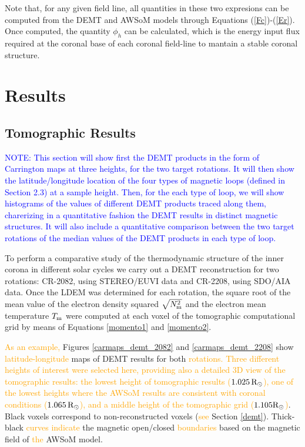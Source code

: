 \documentclass[namedreferences]{solarphysics}
\newcommand{\mrsun}{{\rm R_\odot}}
\newcommand{\Tm}{T_{\rm m}}
\newcommand{\Nsqm}{N^2_{{\rm m}}}
\newcommand{\sqravgN}{\sqrt{\Nsqm}}
\def\albert#1{\textcolor{orange}{#1}}
\def\notebyalbert#1{\textcolor{blue}{NOTE: #1}}
\begin{document}
\begin{article}
{Note that, for any given field line, all quantities in these two expresions can be computed from the DEMT and AWSoM models through Equations (\ref{Fc})-(\ref{Er}). Once computed, the quantity $\phi_h$ can be calculated, which is the energy input flux required at the coronal base of each coronal field-line to mantain a stable coronal structure.}


\section{Results}\label{resu} 

\subsection{Tomographic Results}\label{demt_res} 

\noindent\notebyalbert{This section will show first the DEMT products in the form of Carrington maps at three heights, for the two target rotations. It will then show the latitude/longitude location of the four types of  magnetic loops (defined in Section 2.3) at a sample height. Then, for the each type of loop, we will show histograms of the values of different DEMT products traced along them, charerizing in a quantitative fashion the DEMT results in distinct magnetic structures. It will also include a quantitative comparison between the two target rotations of the median values of the DEMT products in each type of loop.}

{To perform a comparative study of the thermodynamic structure of the inner corona in different solar cycles
we carry out a DEMT reconstruction for two rotations: CR-2082, using STEREO/EUVI data and CR-2208, using SDO/AIA data.} {Once the LDEM was determined for each rotation, the square root of the mean value of the electron density squared $\sqravgN$ and the electron mean temperature $\Tm$ were computed at each voxel of the tomographic computational grid by means of Equations \ref{momento1} and \ref{momento2}.} 

\albert{As an example,} Figures \ref{carmaps_demt_2082} and \ref{carmaps_demt_2208} show \albert{latitude-longitude} maps of DEMT results for both \albert{rotations. Three different heights of interest were selected here, providing also a detailed 3D view of the tomographic results: the lowest height of tomographic results ($1.025\,\mrsun$), one of the lowest heights where the AWSoM results are consistent with coronal conditions ($1.065\,\mrsun$), and a middle height of the tomographic grid ($1.105\mrsun$)}. Black voxels correspond to non-reconstructed voxels (\albert{see} Section \ref{demt}). Thick-black \albert{curves indicate} the magnetic open/closed \albert{boundaries} based on the magnetic field of \albert{the} AWSoM model. 


\end{article}
\end{document}
